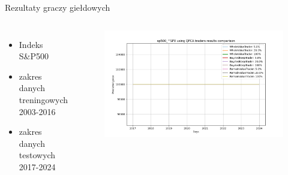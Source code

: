 \begin{frame}{Rezultaty graczy giełdowych}
    \begin{columns}[t]
            \begin{itemize}
                \item Indeks S\&P500
                \item zakres danych treningowych 2003-2016
                \item zakres danych testowych 2017-2024
            \end{itemize}
        \centering
        \begin{figure}
            \centering
            \includegraphics[width=1\textwidth]{images/qpca_traders.png}
        \end{figure}    
    \end{columns}
\end{frame}
